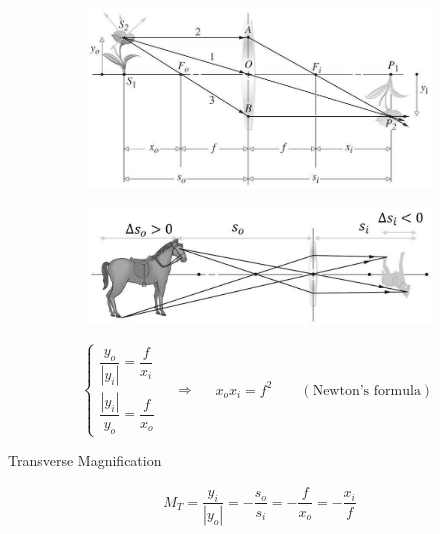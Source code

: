 \begin{figure}[H]
  \centering
  \begin{subfigure}{.45\textwidth}
    \centering
      \includegraphics[width=\linewidth]{figures/Magnification-transverse.jpg}
  \end{subfigure}
  \begin{subfigure}{.45\textwidth}
    \centering
      \includegraphics[width=\linewidth]{figures/Magnification-longitudinal.jpg}
  \end{subfigure}
\end{figure}

\begin{equation*}
  \left\{
  \begin{aligned}
    \dfrac{y_o}{|y_i|} = \dfrac{f}{x_i} \\
    \dfrac{|y_i|}{y_o} = \dfrac{f}{x_o}  
  \end{aligned}
  \right.
  \quad \Rightarrow \quad
  \begin{aligned}
    x_o x_i = f^2 \quad\quad \left( \text{Newton's formula} \right)
  \end{aligned}
\end{equation*}


Transverse Magnification

\begin{equation*}
  \begin{aligned}
    M_T = \dfrac{y_i}{|y_o|} = - \dfrac{s_o}{s_i} = - \dfrac{f}{x_o} = - \dfrac{x_i}{f}  
  \end{aligned}
\end{equation*}

